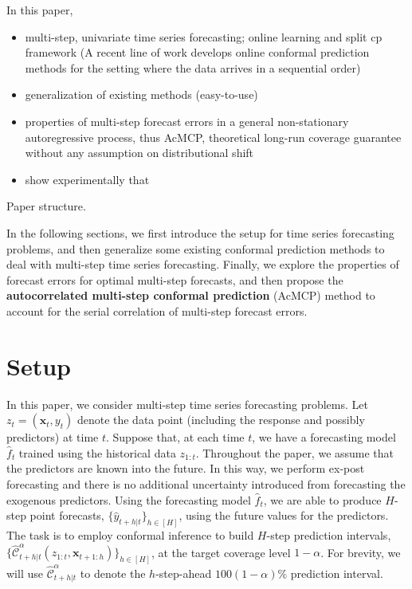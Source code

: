 \documentclass[
  11pt,
  a4paper,
]{article}
\theoremstyle{plain}
\theoremstyle{remark}
\begin{document}
In this paper,

\begin{itemize}
\item
  multi-step, univariate time series forecasting; online learning and
  split cp framework (A recent line of work develops online conformal
  prediction methods for the setting where the data arrives in a
  sequential order)
\item
  generalization of existing methods (easy-to-use)
\item
  properties of multi-step forecast errors in a general non-stationary
  autoregressive process, thus AcMCP, theoretical long-run coverage
  guarantee without any assumption on distributional shift
\item
  show experimentally that
\end{itemize}

Paper structure.

In the following sections, we first introduce the setup for time series
forecasting problems, and then generalize some existing conformal
prediction methods to deal with multi-step time series forecasting.
Finally, we explore the properties of forecast errors for optimal
multi-step forecasts, and then propose the \textbf{autocorrelated
multi-step conformal prediction} (AcMCP) method to account for the
serial correlation of multi-step forecast errors.

\section{Setup}\label{sec-setup}

In this paper, we consider multi-step time series forecasting problems.
Let \(z_t = (\bm{x}_t, y_t)\) denote the data point (including the
response and possibly predictors) at time \(t\). Suppose that, at each
time \(t\), we have a forecasting model \(\hat{f}_t\) trained using the
historical data \(z_{1:t}\). Throughout the paper, we assume that the
predictors are known into the future. In this way, we perform ex-post
forecasting and there is no additional uncertainty introduced from
forecasting the exogenous predictors. Using the forecasting model
\(\hat{f}_t\), we are able to produce \(H\)-step point forecasts,
\(\{\hat{y}_{t+h|t}\}_{h\in[H]}\), using the future values for the
predictors. The task is to employ conformal inference to build
\(H\)-step prediction intervals,
\(\{\hat{\mathcal{C}}_{t+h|t}^{\alpha}\left(z_{1:t},\bm{x}_{t+1:h}\right)\}_{h\in[H]}\),
at the target coverage level \(1-\alpha\). For brevity, we will use
\(\hat{\mathcal{C}}_{t+h|t}^{\alpha}\) to denote the \(h\)-step-ahead
\(100(1-\alpha)\%\) prediction interval.
\end{document}
